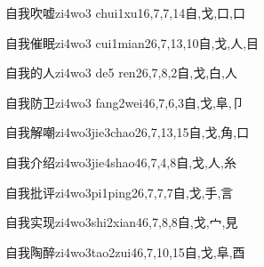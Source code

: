 \begin{EntryWithPhonetic}{自我吹嘘}{zi4wo3 chui1xu1}{6,7,7,14}{⾃,⼽,⼝,⼝}
\end{EntryWithPhonetic}

\begin{EntryWithPhonetic}{自我催眠}{zi4wo3 cui1mian2}{6,7,13,10}{⾃,⼽,⼈,⽬}
\end{EntryWithPhonetic}

\begin{EntryWithPhonetic}{自我的人}{zi4wo3 de5 ren2}{6,7,8,2}{⾃,⼽,⽩,⼈}
\end{EntryWithPhonetic}

\begin{EntryWithPhonetic}{自我防卫}{zi4wo3 fang2wei4}{6,7,6,3}{⾃,⼽,⾩,⼙}
\end{EntryWithPhonetic}

\begin{EntryWithPhonetic}{自我解嘲}{zi4wo3jie3chao2}{6,7,13,15}{⾃,⼽,⾓,⼝}
\end{EntryWithPhonetic}

\begin{EntryWithPhonetic}{自我介绍}{zi4wo3jie4shao4}{6,7,4,8}{⾃,⼽,⼈,⽷}
\end{EntryWithPhonetic}

\begin{EntryWithPhonetic}{自我批评}{zi4wo3pi1ping2}{6,7,7,7}{⾃,⼽,⼿,⾔}
\end{EntryWithPhonetic}

\begin{EntryWithPhonetic}{自我实现}{zi4wo3shi2xian4}{6,7,8,8}{⾃,⼽,⼧,⾒}
\end{EntryWithPhonetic}

\begin{EntryWithPhonetic}{自我陶醉}{zi4wo3tao2zui4}{6,7,10,15}{⾃,⼽,⾩,⾣}
\end{EntryWithPhonetic}

